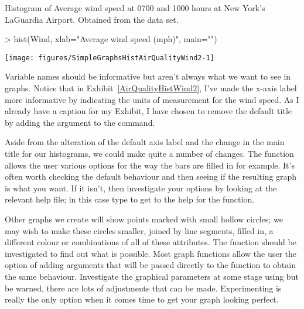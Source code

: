 \begin{exhibit} 
\begin{center} 
\caption{Histogram of Average wind speed at 0700 and 1000 hours at New York's LaGuardia Airport. Obtained from the  data set.} 
\label{AirQualityHistWind2} 

\begin{Schunk}
\begin{Sinput}
> hist(Wind, xlab="Average wind speed (mph)", main="") 
\end{Sinput}
\end{Schunk}
\texttt{[image: figures/SimpleGraphsHistAirQualityWind2-1]} 


\end{center} 
\end{exhibit} 
 
Variable names should be informative but aren't always what we want to see in graphs. Notice that in Exhibit~\ref{AirQualityHistWind2}, I've made the x-axis label more informative by indicating the units of measurement for the wind speed. As I already have a caption for my Exhibit, I have chosen to remove the default title by adding the argument  to the  command. 
 
Aside from the alteration of the default axis label and the change in the main title for our histograms, we could make quite a number of changes. The  function allows the user various options for the way the bars are filled in for example. It's often worth checking the default behaviour and then seeing if the resulting graph is what you want. If it isn't, then investigate your options by looking at the relevant help file; in this case type  to get to the help for the  function. 
 
 Other graphs we create will show points marked with small hollow circles; we may wish to make these circles smaller, joined by line segments, filled in, a different colour or combinations of all of these attributes. The  function should be investigated to find out what is possible. Most graph functions allow the user the option of adding arguments that will be passed directly to the  function to obtain the same behaviour. Investigate the graphical parameters at some stage using  but be warned, there are lots of adjustments that can be made. Experimenting is really the only option when it comes time to get your graph looking perfect. 
 
